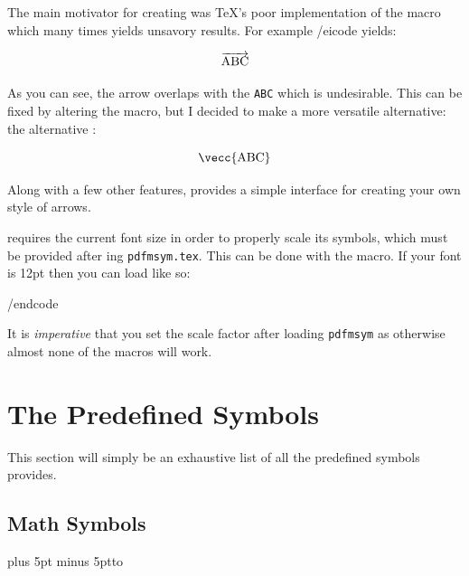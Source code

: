 The main motivator for creating \pdfMsym{} was \TeX's poor implementation of the \macroname\overrightarrow{} macro which many
times yields unsavory results.
For example \icode {}/eicode{} yields:

$$ \overrightarrow{\rm ABC} $$

As you can see, the arrow overlaps with the {\tt ABC} which is undesirable.
This can be fixed by altering the \macroname\rightarrow{} macro, but I decided to make a more versatile alternative:
the \pdfMsym{} alternative \macroname\vecc{}:

$$ \vecc{\hbox{ABC}} $$

Along with a few other features, \pdfMsym{} provides a simple interface for creating your own style of arrows.

\pdfMsym{} requires the current font size in order to properly scale its symbols, which must be provided after
{\tt\string}ing {\tt pdfmsym.tex}.
This can be done with the \macroname\pdfmsymsetscalefactor{} macro.
If your font is 12pt then you can load \pdfMsym{} like so:

\begincode

/endcode\par

It is {\it imperative} that you set the scale factor after loading {\tt pdfmsym} as otherwise almost none of the macros will
work.

\section{The Predefined Symbols}

This section will simply be an exhaustive list of all the predefined symbols \pdfMsym{} provides.

\subsection{Math Symbols}

{\tabskip=10pt plus 5pt minus 5pt\jot\halign to }

